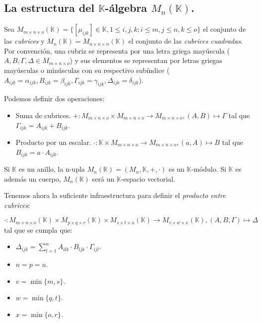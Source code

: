 \documentclass[a4paper, titlepage]{article}
\begin{document}
\subsection{La estructura del $\mathbb{K}$-álgebra $M_n (\mathbb{K})$.}

Sea $M_{m\times n\times o} (\mathbb{K}) = \{ [\mu_{ijk}] \in \mathbb{K}, 1 \le i,j,k; i \le m, j \le n, k \le o\}$ el conjunto de las \textit{cubrices} y $M_n (\mathbb{K}) = M_{n\times n\times n} (\mathbb{K})$ el conjunto de las \textit{cubrices cuadradas}. Por convención, una cubriz se representa por una letra griega mayúscula ($A, B, \Gamma, \Delta \in M_{m\times n\times o}$) y sus elementos se representan por letras griegas mayúsculas o minúsculas con su respectivo subíndice ($A_{ijk} = \alpha_{ijk}, B_{ijk} = \beta_{ijk}, \Gamma_{ijk} = \gamma_{ijk}, \Delta_{ijk} = \delta_{ijk}$).


Podemos definir dos operaciones:

\begin{itemize}
	\item Suma de cubrices. $+: M_{m\times n\times o} \times M_{m\times n\times o} \rightarrow M_{m\times n\times o}, (A, B) \mapsto \Gamma$ tal que $\Gamma_{ijk} = A_{ijk} + B_{ijk}$.
	\item Producto por un escalar. $\cdot: \mathbb{K} \times M_{m\times n\times o} \rightarrow M_{m\times n\times o}, (a, A) \mapsto B$ tal que $B_{ijk} = a \cdot A_{ijk}$.
\end{itemize}

Si $\mathbb{K}$ es un anillo, la n-upla $M_n (\mathbb{K}) = (M_n, \mathbb{K}, +, \cdot)$ es un $\mathbb{K}$-módulo. Si $\mathbb{K}$ es además un cuerpo, $M_n (\mathbb{K})$ será un $\mathbb{K}$-espacio vectorial.

\newpage

Tenemos ahora la suficiente infraestructura para definir el \textit{producto entre cubrices}:

$$\cdot: M_{m\times n\times o} (\mathbb{K}) \times M_{p\times q\times r} (\mathbb{K}) \times M_{s\times t\times u} (\mathbb{K}) \rightarrow M_{v\times w\times x} (\mathbb{K}), (A, B, \Gamma) \mapsto \Delta$$ tal que se cumpla que:

\begin{itemize}
	\item $\Delta_{ijk} = \sum\limits_{l=1}^{n} A_{ilk} \cdot B_{ljk} \cdot \Gamma_{ijl}$.
	\item $n = p = u$.
	\item $v = \min\{m, s\}$.
	\item $w = \min\{q, t\}$.
	\item $x = \min\{o, r\}$.
\end{itemize}
\end{document}
